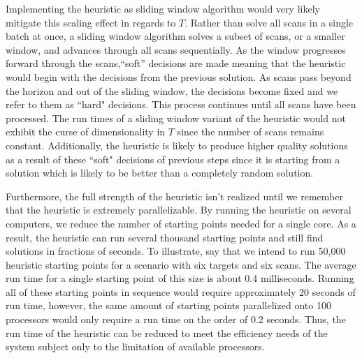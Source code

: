 Implementing the heuristic as sliding window algorithm would very likely mitigate this scaling effect in regards to $T$. Rather than solve all scans in a single batch at once, a sliding window algorithm solves a subset of scans, or a smaller window, and advances through all scans sequentially.  As the window progresses forward through the scans,``soft'' decisions are made meaning that the heuristic would begin with the decisions from the previous solution. As scans pass beyond the horizon and out of the sliding window, the decisions become fixed and we refer to them as ``hard" decisions. This process continues until all scans have been processed. The run times of a sliding window variant of the heuristic would not exhibit the curse of dimensionality in $T$ since the number of scans remains constant. Additionally, the heuristic is likely to produce higher quality solutions as a result of these ``soft" decisions of previous steps since it is starting from a solution which is likely to be better than a completely random solution. 

Furthermore, the full strength of the heuristic isn't realized until we remember that the heuristic is extremely parallelizable. By running the heuristic on several computers, we reduce the number of starting points needed for a single core. As a result, the heuristic can run several thousand starting points and still find solutions in fractions of seconds. To illustrate, say that we intend to run 50,000 heuristic starting points for a scenario with six targets and six scans. The average run time for a single starting point of this size is about 0.4 milliseconds. Running all of these starting points in sequence would require approximately 20 seconds of run time, however, the same amount of starting points parallelized onto 100 processors would only require a run time on the order of 0.2 seconds. Thus, the run time of the heuristic can be reduced to meet the efficiency needs of the system subject only to the limitation of available processors. 

